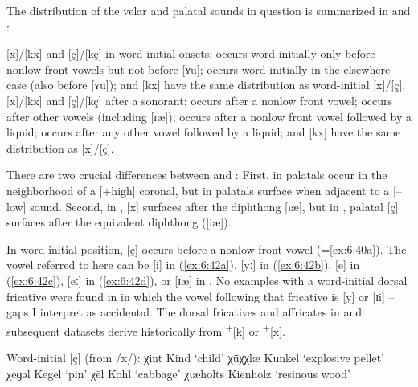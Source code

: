 The distribution of the velar and palatal sounds in question is summarized in  and :

\ea%
\label{ex:6:40}[x]/[kx] and [ç]/[kç] in word-initial onsets:
\ea\label{ex:6:40a}\relax [ç] occurs word-initially only before nonlow front vowels but not before [ʏu];
\ex\label{ex:6:40b}\relax [x] occurs word-initially in the elsewhere case (also before [ʏu]);
\ex\label{ex:6:40c}\relax [kç] and [kx] have the same distribution as word-initial [x]/[ç].
\z
\ex%
\label{ex:6:41}[x]/[kx] and [ç]/[kç] after a sonorant:
\ea\label{ex:6:41a}\relax [ç] occurs after a nonlow front vowel;
\ex\label{ex:6:41b}\relax [x] occurs after other vowels (including [ɪæ]);
\ex\label{ex:6:41c}\relax [ç] occurs after a nonlow front vowel followed by a liquid;
\ex\label{ex:6:41d}\relax [x] occurs after any other vowel followed by a liquid;
\ex\label{ex:6:41e}\relax [kç] and [kx] have the same distribution as [x]/[ç].
\z
\z 

There are two crucial differences between  and : First, in  palatals occur in the neighborhood of a [+high] coronal, but in  palatals surface when adjacent to a [--low] sound. Second, in , [x] surfaces after the diphthong [ɪæ], but in , palatal [ç] surfaces after the equivalent diphthong ([iæ]).

 In word-initial position, [ç] occurs before a nonlow front vowel (=\ref{ex:6:40a}). The vowel referred to here can be [i] in (\ref{ex:6:42a}), [yː] in (\ref{ex:6:42b}), [e] in (\ref{ex:6:42c}), [eː] in (\ref{ex:6:42d}), or [ɪæ] in . No examples with a word-initial dorsal fricative were found in \citet{Brun1918} in which the vowel following that fricative is [y] or [ɪi] -- gaps I interpret as accidental. The dorsal fricatives and affricates in  and subsequent datasets derive historically from  \textsuperscript{+}[k] or \textsuperscript{+}[x].


\ea%
Word-initial [ç] (from /x/):\label{ex:6:42}
   \ea\label{ex:6:42a} χint     \tab [çint]     \tab Kind     \tab ‘child’            
   \ex\label{ex:6:42b} χǖχχlæ   \tab [çyːççlæ]  \tab Kunkel   \tab ‘explosive pellet’ 
   \ex\label{ex:6:42c} χeɡəl    \tab [çegəl]    \tab Kegel    \tab ‘pin’              
   \ex\label{ex:6:42d} χēl      \tab [çeːl]     \tab Kohl     \tab ‘cabbage’          
   \ex\label{ex:6:42e} χɩæholts \tab [çɪæholts] \tab Kienholz \tab ‘resinous wood’    
  \z
\z 


